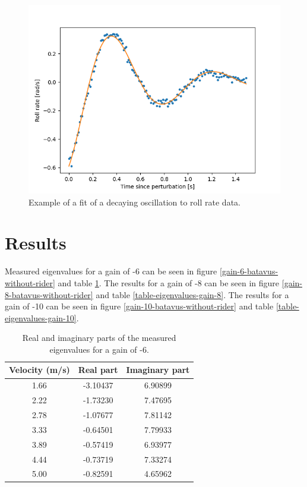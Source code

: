 \documentclass[12pt]{article}
\begin{document}
\begin{figure}[h]
    \centering
    \includegraphics[width=\columnwidth]{figures/example_roll_rate_fit.png}
    \caption{Example of a fit of a decaying oscillation to roll rate data.}
    \label{example-roll-rate-fit}
\end{figure}


\section{Results}
Measured eigenvalues for a gain of -6 can be seen in figure \ref{gain-6-batavus-without-rider} and table \ref{table-eigenvalues-gain-6}. The results for a gain of -8 can be seen in figure \ref{gain-8-batavus-without-rider} and table \ref{table-eigenvalues-gain-8}. The results for a gain of -10 can be seen in figure \ref{gain-10-batavus-without-rider} and table \ref{table-eigenvalues-gain-10}.


\begin{table}[]
    \centering
    \caption{Real and imaginary parts of the measured eigenvalues for a gain of -6.}
    \label{table-eigenvalues-gain-6}
    \begin{tabular}{c|c|c}
        \textbf{Velocity (m/s)} & \textbf{Real part} & \textbf{Imaginary part} \\ \hline
        1.66                    & -3.10437           & 6.90899                 \\
        2.22                    & -1.73230           & 7.47695                 \\
        2.78                    & -1.07677           & 7.81142                 \\
        3.33                    & -0.64501           & 7.79933                 \\
        3.89                    & -0.57419           & 6.93977                 \\
        4.44                    & -0.73719           & 7.33274                 \\
        5.00                    & -0.82591           & 4.65962                
    \end{tabular}
\end{table}
\end{document}
